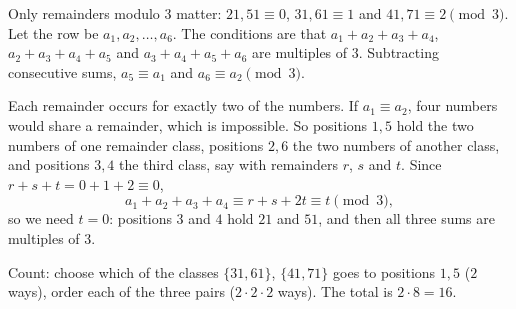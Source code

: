 Only remainders modulo $3$ matter: $21,51\equiv0$, $31,61\equiv1$ and $41,71\equiv2\pmod3$. Let the row be $a_1,a_2,\dots,a_6$. The conditions are that $a_1+a_2+a_3+a_4$, $a_2+a_3+a_4+a_5$ and $a_3+a_4+a_5+a_6$ are multiples of $3$. Subtracting consecutive sums, $a_5\equiv a_1$ and $a_6\equiv a_2\pmod 3$.

Each remainder occurs for exactly two of the numbers. If $a_1\equiv a_2$, four numbers would share a remainder, which is impossible. So positions $1,5$ hold the two numbers of one remainder class, positions $2,6$ the two numbers of another class, and positions $3,4$ the third class, say with remainders $r$, $s$ and $t$. Since $r+s+t=0+1+2\equiv0$,
\[a_1+a_2+a_3+a_4\equiv r+s+2t\equiv t\pmod3,\]
so we need $t=0$: positions $3$ and $4$ hold $21$ and $51$, and then all three sums are multiples of $3$.

Count: choose which of the classes $\{31,61\}$, $\{41,71\}$ goes to positions $1,5$ ($2$ ways), order each of the three pairs ($2\cdot2\cdot2$ ways). The total is $2\cdot8=\boxed{16}$.
